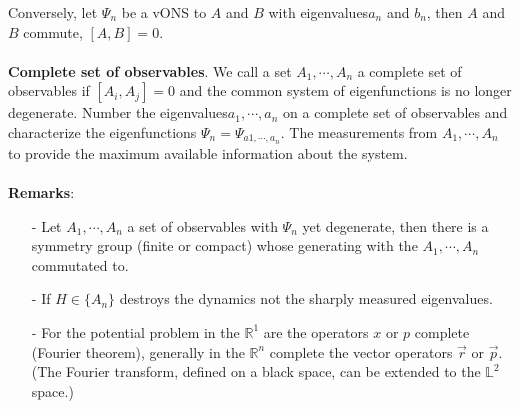 Conversely, let {$\Psi_n$} be a vONS to $A$ and $B$ with eigenvalues ​​$a_n$ and $b_n$, then $A$ and $B$ commute, $[A, B] = 0$.\\\\
\textbf{Complete set of observables}. We call a set $A_1, \cdots, A_n$ a complete set of observables if $[A_i, A_j] = 0$ and the common system of eigenfunctions is no longer degenerate. Number the eigenvalues ​​$a_1, \cdots,a_n$ on a complete set of observables and characterize the eigenfunctions $Ψ_n = Ψ_{a1, \cdots,a_n}$. The measurements
from $A_1, \cdots,A_n$ to provide the maximum available information about the system.\\\\
\textbf{Remarks}: 
\begin{itemize}
    \item[-] Let $A_1, \cdots, A_n$ a set of observables with $\Psi_n$ yet degenerate, then there is a symmetry group (finite or compact) whose
    generating with the $A_1, \cdots,A_n$ commutated to.
    \item[-]  If $H \in \{A_n\}$ destroys the dynamics not the sharply measured eigenvalues. 
    \item[-] For the potential problem in the $\mathbb{R}^1$ are the operators $x$ or $p$ complete (Fourier theorem), generally in the $\mathbb{R}^n$ complete the vector operators $\vec{r}$ or $\vec{p}$. (The Fourier transform, defined on a black space, can be extended to the $\mathbb{L}^2$ space.)
\end{itemize}

